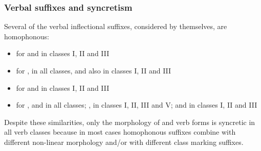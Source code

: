\subsubsection{Verbal suffixes and syncretism}\label{verbalSuffixesSyncretism}
Several of the verbal inflectional suffixes, considered by themselves, are homophonous: %
\begin{itemize}
\item{ for  and  in classes I, II and III}
\item{ for ,  in all classes, and also  in classes I, II and III}
\item{ for  and  in classes I, II and III}
\item{ for ,  and  in all classes; ,  in classes I, II, III and V; and  in classes I, II and III}
\end{itemize}

Despite these similarities, only the morphology of  and  verb forms is syncretic in all verb classes because in most cases homophonous suffixes combine with different non-linear morphology and/or with different class marking suffixes. 

\clearpage

